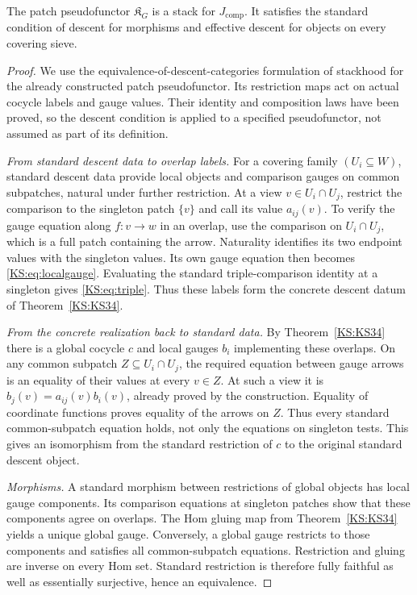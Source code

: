 \begin{KStheorem}\label{KS:KS36}
The patch pseudofunctor \(\mathfrak K_G\) is a stack for \(J_{\mathrm{comp}}\). It satisfies the standard condition of descent for morphisms and effective descent for objects on every covering sieve.
\end{KStheorem}
\begin{proof}
We use the equivalence-of-descent-categories formulation of stackhood for the already constructed patch pseudofunctor. Its restriction maps act on actual cocycle labels and gauge values. Their identity and composition laws have been proved, so the descent condition is applied to a specified pseudofunctor, not assumed as part of its definition.

\emph{From standard descent data to overlap labels.} For a covering family $(U_i\subseteq W)$, standard descent data provide local objects and comparison gauges on common subpatches, natural under further restriction. At a view $v\in U_i\cap U_j$, restrict the comparison to the singleton patch $\{v\}$ and call its value $a_{ij}(v)$. To verify the gauge equation along $f:v\to w$ in an overlap, use the comparison on $U_i\cap U_j$, which is a full patch containing the arrow. Naturality identifies its two endpoint values with the singleton values. Its own gauge equation then becomes \eqref{KS:eq:localgauge}. Evaluating the standard triple-comparison identity at a singleton gives \eqref{KS:eq:triple}. Thus these labels form the concrete descent datum of Theorem~\ref{KS:KS34}.

\emph{From the concrete realization back to standard data.} By Theorem~\ref{KS:KS34} there is a global cocycle $c$ and local gauges $b_i$ implementing these overlaps. On any common subpatch $Z\subseteq U_i\cap U_j$, the required equation between gauge arrows is an equality of their values at every $v\in Z$. At such a view it is $b_j(v)=a_{ij}(v)b_i(v)$, already proved by the construction. Equality of coordinate functions proves equality of the arrows on $Z$. Thus every standard common-subpatch equation holds, not only the equations on singleton tests. This gives an isomorphism from the standard restriction of $c$ to the original standard descent object.

\emph{Morphisms.} A standard morphism between restrictions of global objects has local gauge components. Its comparison equations at singleton patches show that these components agree on overlaps. The Hom gluing map from Theorem~\ref{KS:KS34} yields a unique global gauge. Conversely, a global gauge restricts to those components and satisfies all common-subpatch equations. Restriction and gluing are inverse on every Hom set. Standard restriction is therefore fully faithful as well as essentially surjective, hence an equivalence.


\end{proof}
